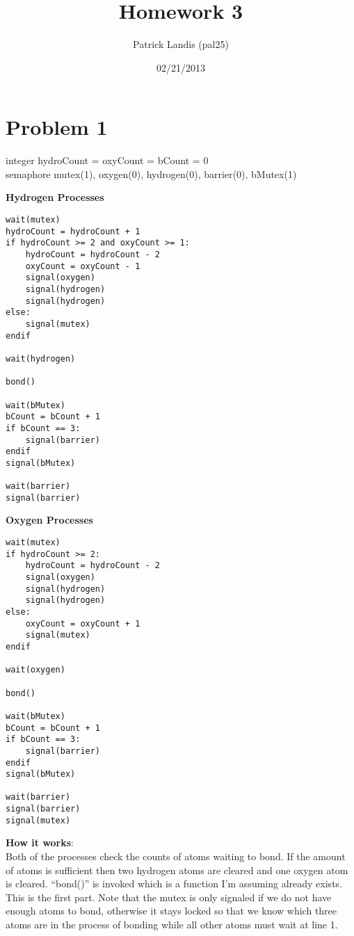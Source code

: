 \documentclass[]{article}
\title{Homework 3}
\author{Patrick Landis (pal25)}
\date{02/21/2013}
\begin{document}
\maketitle

\section*{Problem 1}
integer hydroCount = oxyCount = bCount = 0 \\
semaphore mutex(1), oxygen(0), hydrogen(0), barrier(0), bMutex(1)
\begin{multicols}{2}
\textbf{Hydrogen Processes}
\begin{verbatim}
wait(mutex)
hydroCount = hydroCount + 1
if hydroCount >= 2 and oxyCount >= 1:
    hydroCount = hydroCount - 2
    oxyCount = oxyCount - 1
    signal(oxygen)
    signal(hydrogen)
    signal(hydrogen)
else:
    signal(mutex)
endif

wait(hydrogen)

bond()

wait(bMutex)
bCount = bCount + 1
if bCount == 3:
    signal(barrier)
endif
signal(bMutex)

wait(barrier)
signal(barrier)
\end{verbatim}

\textbf{Oxygen Processes}
\begin{verbatim}
wait(mutex)
if hydroCount >= 2:
    hydroCount = hydroCount - 2
    signal(oxygen)
    signal(hydrogen)
    signal(hydrogen)
else:
    oxyCount = oxyCount + 1
    signal(mutex)
endif

wait(oxygen)

bond()

wait(bMutex)
bCount = bCount + 1
if bCount == 3:
    signal(barrier)
endif
signal(bMutex)

wait(barrier)
signal(barrier)
signal(mutex)
\end{verbatim}
\end{multicols}

\textbf{How it works}: \\
Both of the processes check the counts of atoms waiting to bond. If the amount of atoms is sufficient 
then two hydrogen atoms are cleared and one oxygen atom is cleared. "`bond()"' is invoked which is a 
function I'm assuming already exists. This is the first part. Note that the mutex is only signaled
if we do not have enough atoms to bond, otherwise it stays locked so that we know which three atoms
are in the process of bonding while all other atoms must wait at line 1.\\
\end{document}

